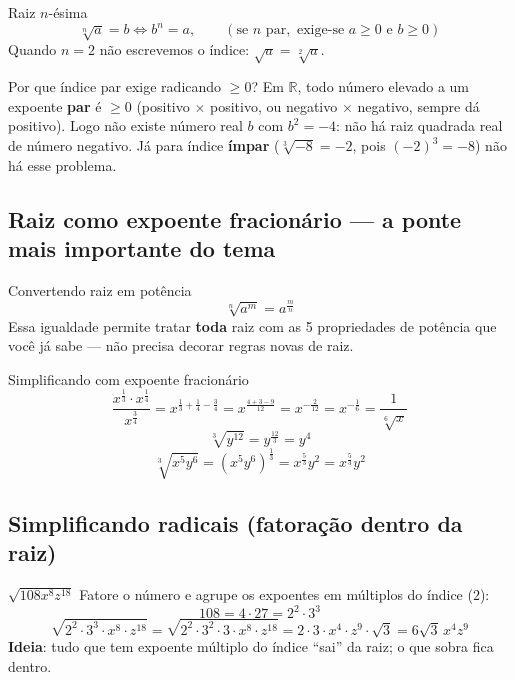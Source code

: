 \documentclass[12pt,a4paper]{article}
\begin{document}
\begin{definicao}{Raiz $n$-ésima}
\[
\sqrt[n]{a} = b \iff b^n = a, \qquad (\text{se } n \text{ par}, \text{ exige-se } a\ge 0 \text{ e } b\ge 0)
\]
Quando $n=2$ não escrevemos o índice: $\sqrt{a}=\sqrt[2]{a}$.
\end{definicao}

\begin{atencao}{Por que índice par exige radicando $\ge 0$?}
Em $\mathbb{R}$, todo número elevado a um expoente \textbf{par} é
$\ge 0$ (positivo $\times$ positivo, ou negativo $\times$ negativo, sempre
dá positivo). Logo não existe número real $b$ com $b^2 = -4$: não há raiz
quadrada real de número negativo. Já para índice \textbf{ímpar}
($\sqrt[3]{-8}=-2$, pois $(-2)^3=-8$) não há esse problema.
\end{atencao}

\subsection{Raiz como expoente fracionário — a ponte mais importante do tema}

\begin{definicao}{Convertendo raiz em potência}
\[
\sqrt[n]{a^m} = a^{\frac{m}{n}}
\]
Essa igualdade permite tratar \textbf{toda} raiz com as 5 propriedades de
potência que você já sabe — não precisa decorar regras novas de raiz.
\end{definicao}

\begin{exemplo}{Simplificando com expoente fracionário}
\[
\frac{x^{\frac13}\cdot x^{\frac14}}{x^{\frac34}} = x^{\frac13+\frac14-\frac34} = x^{\frac{4+3-9}{12}} = x^{-\frac{2}{12}} = x^{-\frac16} = \frac{1}{\sqrt[6]{x}}
\]
\[
\sqrt[3]{y^{12}} = y^{\frac{12}{3}} = y^{4}
\]
\[
\sqrt[3]{x^5 y^6} = (x^5y^6)^{\frac13} = x^{\frac53}y^{2} = x^{\frac53}y^2
\]
\end{exemplo}

\subsection{Simplificando radicais (fatoração dentro da raiz)}

\begin{exemplo}{$\sqrt{108x^8z^{18}}$}
Fatore o número e agrupe os expoentes em múltiplos do índice ($2$):
\[
108 = 4\cdot27 = 2^2\cdot 3^3
\]
\[
\sqrt{2^2\cdot3^3\cdot x^8 \cdot z^{18}} = \sqrt{2^2\cdot3^2\cdot3\cdot x^8\cdot z^{18}} = 2\cdot3\cdot x^4\cdot z^9\cdot\sqrt{3} = 6\sqrt3\,x^4z^9
\]
\textbf{Ideia}: tudo que tem expoente múltiplo do índice ``sai'' da raiz;
o que sobra fica dentro.
\end{exemplo}
\end{document}
